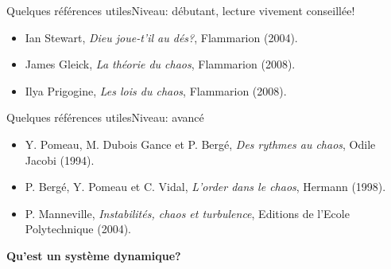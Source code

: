 \documentclass[usenames,dvipsnames,svgnames,10pt,aspectratio=169]{beamer}
\begin{document}
\begin{frame}[t, c]{Quelques références utiles}{Niveau: débutant, lecture vivement conseillée!}
	\begin{itemize}
		\item Ian Stewart, \emph{Dieu joue-t'il au dés?}, Flammarion (2004).
		\bigskip
		\item James Gleick, \emph{La théorie du chaos}, Flammarion (2008).
		\bigskip
		\item Ilya Prigogine, \emph{Les lois du chaos}, Flammarion (2008).
	\end{itemize}

	\vspace{1cm}
\end{frame}

\begin{frame}[t, c]{Quelques références utiles}{Niveau: avancé}
	\begin{itemize}
		\item Y. Pomeau, M. Dubois Gance et P. Bergé, \emph{Des rythmes au chaos}, Odile Jacobi (1994).

		\bigskip

		\item P. Bergé, Y. Pomeau et C. Vidal, \emph{L'order dans le chaos}, Hermann (1998).

		\bigskip

		\item P. Manneville, \emph{Instabilités, chaos et turbulence}, Editions de l'Ecole Polytechnique (2004).
	\end{itemize}

	\vspace{1cm}
\end{frame}




\begin{frame}[t, c]{}{}

	\centering

	{\Large \textbf{Qu'est un système dynamique?}}

	\bigskip


	\vspace{-2cm}
\end{frame}
\end{document}
